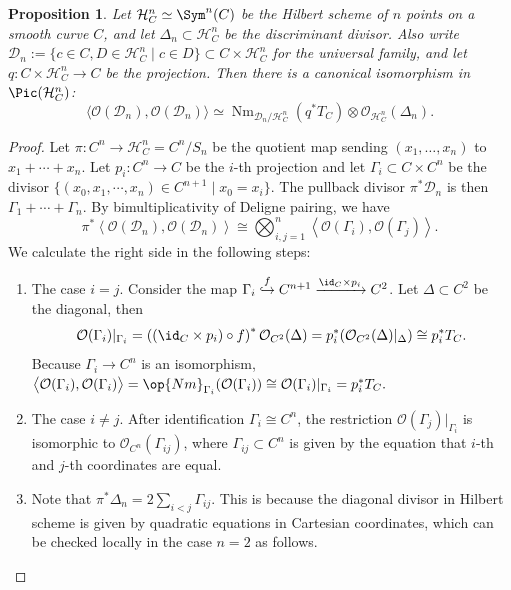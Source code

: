\documentclass{amsart}
\numberwithin{equation}{section}
\numberwithin{figure}{section}
\newtheorem{prop}[thm]{Proposition}
\theoremstyle{definition}
\theoremstyle{remark}
\renewcommand{\c}[1]{\mathcal{#1}}
\begin{document}
\begin{prop}\label{pairing-delta}
		Let $\c H^n_C\simeq \Sym^n(C)$ be the Hilbert scheme of $n$ points on a smooth curve $C$, and let \(\Delta_n\subset\c H^n_C\) be the discriminant divisor. Also write $\mathcal D_n:=\{c\in C,D\in \c H_C^n\mid c\in D\}\subset C\times \c H^n_C$ for the universal family, and let $q: C\times \c H^n_C\to C$ be the projection. Then there is a canonical isomorphism in $\Pic(\c H^n_C)$:
	\begin{equation}
		\label{eq:self-pairing-universal-divisor}
		\bigl\langle
		\mathcal O(\mathcal D_n),\mathcal O(\mathcal D_n)
		\bigr\rangle
		\simeq
		\operatorname{Nm}_{\mathcal D_n/\c H^n_C}(q^*T_C)
		\otimes\mathcal O_{\c H^n_C}(\Delta_n).
	\end{equation}
\end{prop}
\begin{proof}
Let $\pi: C^n\to \c H^n_C=C^n/S_n$ be the quotient map sending $(x_1,\ldots,x_n)$ to $x_1+\cdots+x_n$. Let \(p_i:C^n\to C\) be the \(i\)-th projection and let
\(\Gamma_i\subset C\times C^n\) be the divisor $\{(x_0,x_1,\cdots, x_n)\in C^{n+1}\mid x_0=x_i\}$. The pullback divisor $\pi^*\c D_n$ is then
$\Gamma_1+\cdots+\Gamma_n$. By bimultiplicativity of Deligne pairing, we have
$$\pi^*\left\langle \c O(\c D_n), \c O(\c D_n)\right\rangle\cong \bigotimes_{i,j=1}^n\left\langle \c O(\Gamma_i), \c O(\Gamma_j)\right\rangle.$$
We calculate the right side in the following steps:
\begin{enumerate}
\item The case $i=j$. 
Consider the map $\Gamma_i \overset{f}\hookrightarrow C^{n+1}\xrightarrow{\id_C\times p_i}C^2$. Let $\Delta\subset C^2$ be the diagonal, then 
$$\c O(\Gamma_i)|_{\Gamma_i}=\left( (\id_C\times p_i)\circ f \right) ^*\c O_{C^2}(\Delta)=p_i^*(\c O_{C^2}(\Delta)|_{\Delta})\cong  p_i^*T_C .$$
Because
\(\Gamma_i\to C^n\) is an isomorphism, 
$\bigl\langle\mathcal O(\Gamma_i), \mathcal O(\Gamma_i)\bigr\rangle
=\op{Nm}_{\Gamma_i}(\c O(\Gamma_i))
\cong\c O(\Gamma_i)|_{\Gamma_i}= p_i^*T_C.$
\item The case $i\neq j$. After identification $\Gamma_i\cong C^n$, the restriction $\c O(\Gamma_j)|_{\Gamma_i}$ is isomorphic to $\c O_{C^n}(\Gamma_{ij})$, where $\Gamma_{ij}\subset C^n$ is given by the equation that $i$-th and $j$-th coordinates are equal.
\item Note that $\pi^*\Delta_n=2\sum_{i<j}\Gamma_{ij}$. This is because the diagonal divisor in Hilbert scheme is given by quadratic equations in Cartesian coordinates, which can be checked locally in the case $n=2$ as follows. 


\end{enumerate}
\end{proof}
\end{document}
